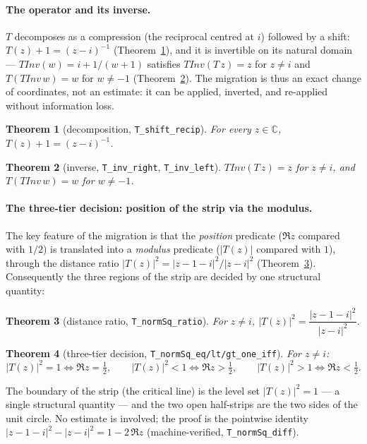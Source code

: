 \documentclass{article}
\newtheorem{theorem}{Theorem}[section]
\newcommand{\C}{\mathbb{C}}
\begin{document}
\paragraph{The operator and its inverse.}
$T$ decomposes as a compression (the reciprocal centred at $i$) followed by
a shift: $T(z)+1=(z-i)^{-1}$ (Theorem~\ref{thm:decomp}), and it is
invertible on its natural domain --- $TInv(w)=i+1/(w+1)$ satisfies
$TInv(T\,z)=z$ for $z\neq i$ and $T(TInv\,w)=w$ for $w\neq-1$
(Theorem~\ref{thm:inverse}). The migration is thus an exact change of
coordinates, not an estimate: it can be applied, inverted, and re-applied
without information loss.

\begin{theorem}[decomposition, \texttt{T\_shift\_recip}]
\label{thm:decomp}
For every $z\in\C$, $T(z)+1=(z-i)^{-1}$.
\end{theorem}

\begin{theorem}[inverse, \texttt{T\_inv\_right}, \texttt{T\_inv\_left}]
\label{thm:inverse}
$TInv(T\,z)=z$ for $z\neq i$, and $T(TInv\,w)=w$ for $w\neq-1$.
\end{theorem}

\paragraph{The three-tier decision: position of the strip via the modulus.}
The key feature of the migration is that the \emph{position} predicate
($\Re z$ compared with $1/2$) is translated into a \emph{modulus} predicate
($|T(z)|$ compared with $1$), through the distance ratio
$|T(z)|^2=|z-1-i|^2/|z-i|^2$ (Theorem~\ref{thm:ratio}). Consequently the
three regions of the strip are decided by one structural quantity:

\begin{theorem}[distance ratio, \texttt{T\_normSq\_ratio}]
\label{thm:ratio}
For $z\neq i$, $|T(z)|^2=\dfrac{|z-1-i|^2}{|z-i|^2}$.
\end{theorem}

\begin{theorem}[three-tier decision, \texttt{T\_normSq\_eq/lt/gt\_one\_iff}]
\label{thm:tiers}
For $z\neq i$:
\[
|T(z)|^2=1 \iff \Re z=\tfrac12,\qquad
|T(z)|^2<1 \iff \Re z>\tfrac12,\qquad
|T(z)|^2>1 \iff \Re z<\tfrac12.
\]
\end{theorem}

The boundary of the strip (the critical line) is the level set
$|T(z)|^2=1$ --- a single structural quantity --- and the two open
half-strips are the two sides of the unit circle. No estimate is involved;
the proof is the pointwise identity
$|z-1-i|^2-|z-i|^2=1-2\,\Re z$ (machine-verified,
\texttt{T\_normSq\_diff}).
\end{document}
